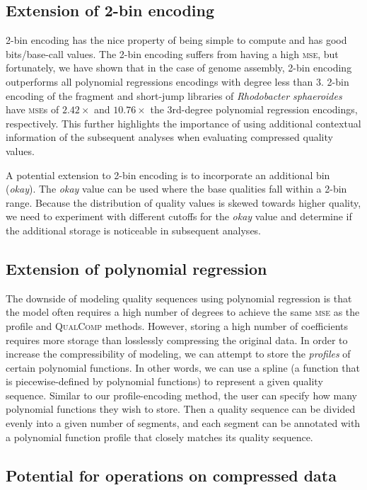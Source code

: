 \subsection{Extension of 2-bin encoding}

2-bin encoding has the nice property of being simple to compute and
has good bits/base-call values. The 2-bin encoding suffers from having
a high \textsc{mse}, but fortunately, we have shown that in the case
of genome assembly, 2-bin encoding outperforms all polynomial
regressions encodings with degree less than 3. 2-bin encoding of the
fragment and short-jump libraries of \textit{Rhodobacter sphaeroides}
have \textsc{mse}s of $2.42\times$ and $10.76\times$ the 3rd-degree
polynomial regression encodings, respectively. This further highlights
the importance of using additional contextual information of the
subsequent analyses when evaluating compressed quality values.

A potential extension to 2-bin encoding is to incorporate an
additional bin (\emph{okay}). The \emph{okay} value can be used where
the base qualities fall within a 2-bin range. Because the distribution
of quality values is skewed towards higher quality, we need to
experiment with different cutoffs for the \emph{okay} value and
determine if the additional storage is noticeable in subsequent
analyses.

\subsection{Extension of polynomial regression}

The downside of modeling quality sequences using polynomial regression is that the model often requires a high number of degrees to achieve the same \textsc{mse} as the profile and \textsc{QualComp} methods.
However, storing a high number of coefficients requires more storage than losslessly compressing the original data.
In order to increase the compressibility of modeling, we can attempt to store the \emph{profiles} of certain polynomial functions.
In other words, we can use a spline (a function that is piecewise-defined by polynomial functions) to represent a given quality sequence.
Similar to our profile-encoding method, the user can specify how many polynomial functions they wish to store.
Then a quality sequence can be divided evenly into a given number of segments, and each segment can be annotated with a polynomial function profile that closely matches its quality sequence.

\subsection{Potential for operations on compressed data}

